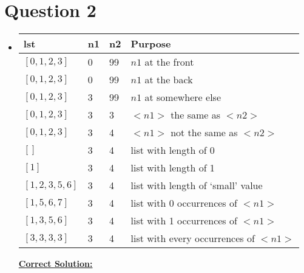 \documentclass[12pt]{article}
\begin{document}
\section*{Question 2}
\begin{itemize}
    \item

    \begin{tabular}{|p{5cm}|p{1cm}|p{1cm}|p{6cm}|}
        \hline
        \textbf{lst} & \textbf{n1} & \textbf{n2} & \textbf{Purpose}\\
        \hline
        $[0,1,2,3]$ & 0 & 99 & $n1$ at the front\\
        \hline
        $[0,1,2,3]$ & 0 & 99 & $n1$ at the back\\
        \hline
        $[0,1,2,3]$ & 3 & 99 & $n1$ at somewhere else\\
        \hline
        $[0,1,2,3]$ & 3 & 3 & $<n1>$ the same as $<n2>$\\
        \hline
        $[0,1,2,3]$ & 3 & 4 & $<n1>$ not the same as $<n2>$\\
        \hline
        $[]$ & 3 & 4 & list with length of 0\\
        \hline
        $[1]$ & 3 & 4 & list with length of 1\\
        \hline
        $[1,2,3,5,6]$ & 3 & 4 & list with length of `small' value\\
        \hline
        $[1,5,6,7]$ & 3 & 4 & list with 0 occurrences of $<n1>$\\
        \hline
        $[1,3,5,6]$ & 3 & 4 & list with 1 occurrences of $<n1>$\\
        \hline
        $[3,3,3,3]$ & 3 & 4 & list with every occurrences of $<n1>$\\
        \hline
    \end{tabular}

    \bigskip

    \begin{mdframed}
        \underline{\textbf{Correct Solution:}}

        \bigskip


\end{mdframed}
\end{itemize}
\end{document}
